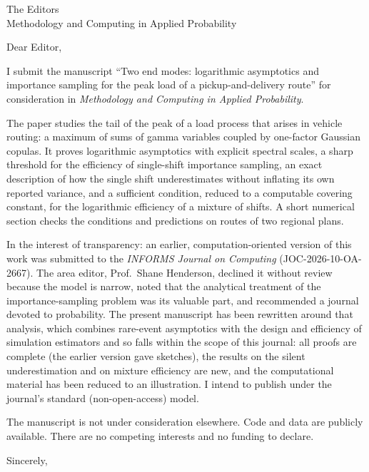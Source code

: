 \documentclass[11pt]{letter}
\begin{document}
\begin{letter}{The Editors\\Methodology and Computing in Applied Probability}
\opening{Dear Editor,}

I submit the manuscript ``Two end modes: logarithmic asymptotics and importance
sampling for the peak load of a pickup-and-delivery route'' for consideration in
\emph{Methodology and Computing in Applied Probability}.

The paper studies the tail of the peak of a load process that arises in vehicle routing:
a maximum of sums of gamma variables coupled by one-factor Gaussian copulas. It proves
logarithmic asymptotics with explicit spectral scales, a sharp threshold for the
efficiency of single-shift importance sampling, an exact description of how the single
shift underestimates without inflating its own reported variance, and a sufficient
condition, reduced to a computable covering constant, for the logarithmic efficiency of
a mixture of shifts. A short numerical section checks the conditions and predictions on
routes of two regional plans.

In the interest of transparency: an earlier, computation-oriented version of this work
was submitted to the \emph{INFORMS Journal on Computing} (JOC-2026-10-OA-2667). The area
editor, Prof.\ Shane Henderson, declined it without review because the model is narrow,
noted that the analytical treatment of the importance-sampling problem was its valuable
part, and recommended a journal devoted to probability. The present manuscript has been
rewritten around that analysis, which combines rare-event asymptotics with the design and
efficiency of simulation estimators and so falls within the scope of this journal: all proofs are
complete (the earlier version gave sketches), the results on the silent underestimation
and on mixture efficiency are new, and the computational material has been reduced to an
illustration. I intend to publish under the journal's standard (non-open-access)
model.

The manuscript is not under consideration elsewhere. Code and data are publicly
available. There are no competing interests and no funding to declare.

\closing{Sincerely,}
\end{letter}
\end{document}
